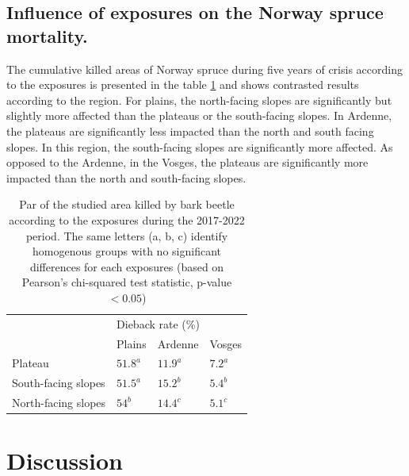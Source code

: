 \documentclass[3p,procedia]{elsarticle}
\begin{document}
\subsection{Influence of  exposures on the Norway spruce mortality.}
The cumulative killed areas of Norway spruce during five years of crisis according to the exposures is presented in the table \ref{tab_or_topo} and shows contrasted results according to the region. 
For plains, the north-facing slopes are significantly but slightly more  affected than the plateaus or the south-facing slopes.
In Ardenne, the plateaus are significantly less impacted than the north and south facing slopes. 
In this region, the south-facing slopes are significantly more affected. 
As opposed to the Ardenne, in the Vosges, the plateaus are significantly more impacted than the north and south-facing slopes.
\begin{table}[htbp]
\caption{Par of the studied area killed by bark beetle according to the exposures during the 2017-2022 period.
The same letters (a, b, c) identify homogenous groups with no significant differences for each exposures  (based on  Pearson's chi-squared test statistic, p-value $< 0.05$)}
\label{tab_or_topo}

\begin{tabular}{|l|lll|}
\hline
\multirow{2}{*}{}  & \multicolumn{3}{l|}{Dieback rate (\%)}                             \\ \cline{2-4} 
                   & \multicolumn{1}{l|}{Plains} & \multicolumn{1}{l|}{Ardenne} & Vosges \\ \hline
Plateau            & \multicolumn{1}{l|}{$51.8^a$ }    & \multicolumn{1}{l|}{$11.9^a$}    & $7.2^a$   \\ \hline
South-facing slopes & \multicolumn{1}{l|}{$51.5^a$}   & \multicolumn{1}{l|}{$15.2^b$}    & $5.4^b$    \\ \hline
North-facing slopes & \multicolumn{1}{l|}{$54^b$}   & \multicolumn{1}{l|}{$14.4^c$}    & $5.1^c$   \\ \hline
\end{tabular}
\end{table}


\section{Discussion}
\end{document}
